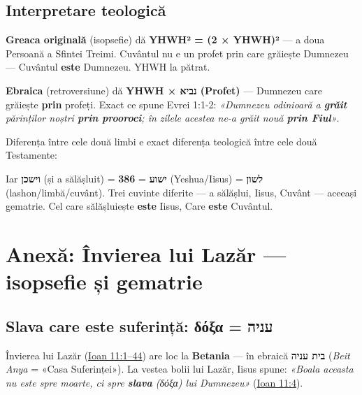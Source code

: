 \documentclass[12pt,a4paper,twoside,openany]{book}
\begin{document}
\section{Interpretare teologică}

\textbf{Greaca originală} (isopsefie) dă \textbf{YHWH² = (2 × YHWH)²} — a doua Persoană a Sfintei Treimi. Cuvântul nu e un profet prin care grăiește Dumnezeu — Cuvântul \textbf{este} Dumnezeu. YHWH la pătrat.

\textbf{Ebraica} (retroversiune) dă \textbf{YHWH × נביא (Profet)} — Dumnezeu care grăiește \textbf{prin} profeți. Exact ce spune Evrei 1:1-2: \textit{«Dumnezeu odinioară a \textbf{grăit} părinților noștri \textbf{prin prooroci}; în zilele acestea ne-a grăit nouă \textbf{prin Fiul}»}.

Diferența între cele două limbi e exact diferența teologică între cele două Testamente:

\begin{center}
\end{center}

\bigskip

Iar \textbf{וישכן} (și a sălășluit) = \textbf{386} = \textbf{ישוע} (Yeshua/Iisus) = \textbf{לשון} (lashon/limbă/cuvânt). Trei cuvinte diferite — a sălășlui, Iisus, Cuvânt — aceeași gematrie. Cel care sălășluiește \textbf{este} Iisus, Care \textbf{este} Cuvântul.

\chapter{Anexă: Învierea lui Lazăr — isopsefie și gematrie}\label{lazar}

\section{Slava care este suferință: δόξα = עניה}

Învierea lui Lazăr (\href{https://bibliaortodoxa.ro/carte.php?id=35\&cap=11\#1}{Ioan 11:1--44}) are loc la \textbf{Betania} — în ebraică \textbf{בית עניה} (\textit{Beit Anya} = «Casa Suferinței»). La vestea bolii lui Lazăr, Iisus spune: \textit{«Boala aceasta nu este spre moarte, ci spre \textbf{slava} (δόξα) lui Dumnezeu»} (\href{https://bibliaortodoxa.ro/carte.php?id=35\&cap=11\#4}{Ioan 11:4}).
\end{document}
